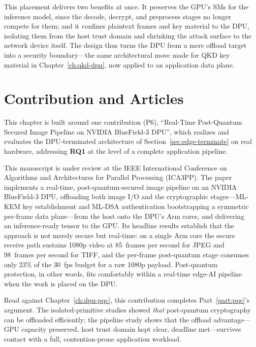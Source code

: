 This placement delivers two benefits at once. It preserves the GPU's SMs for the inference model, since the decode, decrypt, and preprocess stages no longer compete for them; and it confines plaintext frames and key material to the DPU, isolating them from the host trust domain and shrinking the attack surface to the network device itself. The design thus turns the DPU from a mere offload target into a security boundary---the same architectural move made for QKD key material in Chapter~\ref{ch:qkd-dpu}, now applied to an application data plane.

\section{Contribution and Articles}
\label{sec:edge-context}

This chapter is built around one contribution (P6), \enquote{Real-Time Post-Quantum Secured Image Pipeline on NVIDIA BlueField-3 DPU}, which realizes and evaluates the DPU-terminated architecture of Section~\ref{sec:edge-terminate} on real hardware, addressing \textbf{RQ1} at the level of a complete application pipeline.

This manuscript is under review at the IEEE International Conference on Algorithms and Architectures for Parallel Processing (ICA3PP). The paper implements a real-time, post-quantum-secured image pipeline on an NVIDIA BlueField-3 DPU, offloading both image I/O and the cryptographic stages---ML-KEM key establishment and ML-DSA authentication bootstrapping a symmetric per-frame data plane---from the host onto the DPU's Arm cores, and delivering an inference-ready tensor to the GPU. Its headline results establish that the approach is not merely secure but real-time: on a single Arm core the secure receive path sustains 1080p video at 85~frames per second for JPEG and 98~frames per second for TIFF, and the per-frame post-quantum stage consumes only 23\% of the 30~fps budget for a raw 1080p payload. Post-quantum protection, in other words, fits comfortably within a real-time edge-AI pipeline when the work is placed on the DPU.

Read against Chapter~\ref{ch:dpu-pqc}, this contribution completes Part~\ref{part:pqc}'s argument. The isolated-primitive studies showed \emph{that} post-quantum cryptography can be offloaded efficiently; the pipeline study shows that the offload advantage---GPU capacity preserved, host trust domain kept clear, deadline met---survives contact with a full, contention-prone application workload.

